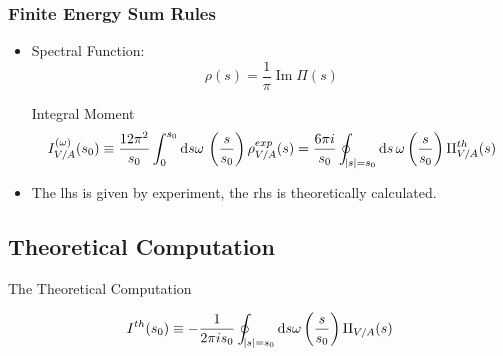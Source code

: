 \documentclass{beamer}
\DeclareMathOperator{\Ima}{Im}
\begin{document}
\begin{frame}
  \frametitle{Finite Energy Sum Rules}
  \begin{itemize}
  \item Spectral Function:
    \begin{equation}
      \rho(s) = \frac{1}{\pi} \Ima \Pi(s)
    \end{equation}
    \begin{block}{Integral Moment}
      \begin{equation}
        I_{V/A}^{(\omega)}(s_0) \equiv \frac{12 \pi^2}{s_0} \int_0^{s_0} \dif s \omega\, \left(\frac{s}{s_0}\right) \rho^{exp}_{V/A}(s)
        = \frac{6 \pi i}{s_0} \oint_{\abs{s}=s_0} \dif s\, \omega\left(\frac{s}{s_0}\right) \Pi^{th}_{V/A}(s)
      \end{equation}
    \end{block}
    \item The lhs is given by experiment, the rhs is theoretically calculated.
  \end{itemize}
\end{frame}

\subsection{Theoretical Computation}
\begin{frame}
  \centering \vspace{0.5cm}
  \begin{LARGE}
    The Theoretical Computation
  \end{LARGE}
  \begin{equation}
    I^{th}(s_0) \equiv - \frac{1}{2 \pi i s_0} \oint_{\abs{s}=s_0} \dif s \omega\left(\frac{s}{s_0}\right) \Pi_{V/A}(s)
  \end{equation}
\end{frame}
\end{document}
